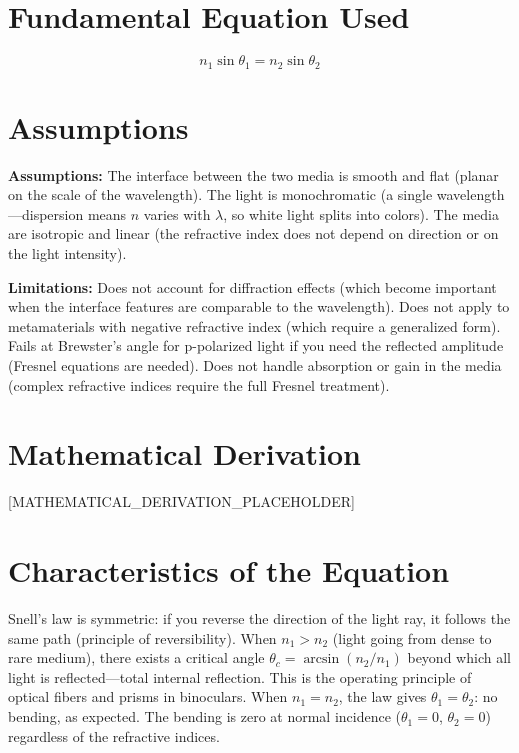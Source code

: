 \documentclass[11pt,openright]{book}
\begin{document}
\section*{Fundamental Equation Used}

\begin{equation}
n_1\sin\theta_1 = n_2\sin\theta_2
\end{equation}
\section*{Assumptions}

\textbf{Assumptions:} The interface between the two media is smooth and flat (planar on the scale of the wavelength). The light is monochromatic (a single wavelength---dispersion means $n$ varies with $\lambda$, so white light splits into colors). The media are isotropic and linear (the refractive index does not depend on direction or on the light intensity).


\textbf{Limitations:} Does not account for diffraction effects (which become important when the interface features are comparable to the wavelength). Does not apply to metamaterials with negative refractive index (which require a generalized form). Fails at Brewster's angle for p-polarized light if you need the reflected amplitude (Fresnel equations are needed). Does not handle absorption or gain in the media (complex refractive indices require the full Fresnel treatment).


\section*{Mathematical Derivation}

[MATHEMATICAL_DERIVATION_PLACEHOLDER]

\section*{Characteristics of the Equation}

Snell's law is symmetric: if you reverse the direction of the light ray, it follows the same path (principle of reversibility). When $n_1 > n_2$ (light going from dense to rare medium), there exists a critical angle $\theta_c = \arcsin(n_2/n_1)$ beyond which all light is reflected---total internal reflection. This is the operating principle of optical fibers and prisms in binoculars. When $n_1 = n_2$, the law gives $\theta_1 = \theta_2$: no bending, as expected. The bending is zero at normal incidence ($\theta_1 = 0$, $\theta_2 = 0$) regardless of the refractive indices.
\end{document}
